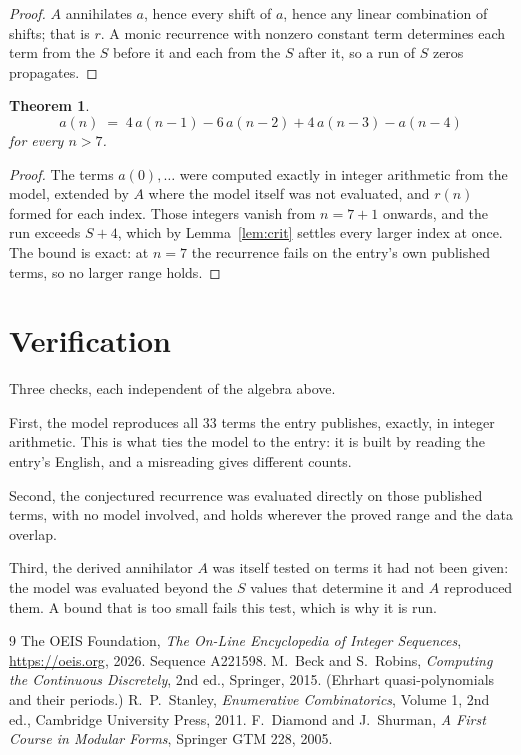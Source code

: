 \documentclass[11pt,a4paper]{article}
\theoremstyle{plain}
\newtheorem{theorem}{Theorem}
\theoremstyle{definition}
\begin{document}
\begin{proof}
$A$ annihilates $a$, hence every shift of $a$, hence any linear combination of shifts; that is
$r$. A monic recurrence with nonzero constant term determines each term from the $S$ before it
and each from the $S$ after it, so a run of $S$ zeros propagates.
\end{proof}

\begin{theorem}
\[
a(n)\;=\;4\,a(n-1) - 6\,a(n-2) + 4\,a(n-3) - a(n-4)
\]
for every $n>7$.
\end{theorem}

\begin{proof}
The terms $a(0),\dots$ were computed exactly in integer arithmetic from the model, extended by
$A$ where the model itself was not evaluated, and $r(n)$ formed for each index. Those integers
vanish from $n=7+1$ onwards, and the run exceeds $S+4$, which by
Lemma~\ref{lem:crit} settles every larger index at once. The bound is exact: at $n=7$ the recurrence fails on the entry's own published terms, so no larger range holds.
\end{proof}

\section{Verification}

Three checks, each independent of the algebra above.

First, the model reproduces all $33$ terms the entry publishes, exactly, in integer
arithmetic. This is what ties the model to the entry: it is built by reading the entry's
English, and a misreading gives different counts.

Second, the conjectured recurrence was evaluated directly on those published terms, with no
model involved, and holds wherever the proved range and the data overlap.

Third, the derived annihilator $A$ was itself tested on terms it had not been given: the model
was evaluated beyond the $S$ values that determine it and $A$ reproduced them. A bound that is
too small fails this test, which is why it is run.

\begin{thebibliography}{9}
 The OEIS Foundation, \emph{The On-Line Encyclopedia of Integer
Sequences}, \url{https://oeis.org}, 2026. Sequence A221598.
 M.~Beck and S.~Robins, \emph{Computing the Continuous Discretely},
2nd ed., Springer, 2015. (Ehrhart quasi-polynomials and their periods.)
 R.~P.~Stanley, \emph{Enumerative Combinatorics}, Volume 1, 2nd ed.,
Cambridge University Press, 2011.
 F.~Diamond and J.~Shurman, \emph{A First Course in Modular Forms},
Springer GTM 228, 2005.
\end{thebibliography}
\end{document}
